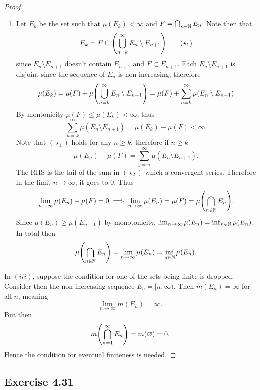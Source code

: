 \documentclass[hw_all.tex]{subfiles}
\begin{document}
\begin{proof}
\begin{enumerate}
        \item 
            Let $E_k$ be the set such that $\mu(E_k) < \infty$ and $F = \bigcap_{n \in \mathbb{N}} E_n$. Note then that
            \[
                E_k = F \;\dot{\cup}\; \qty(\bigcup_{n=k}^\infty E_{n} \setminus E_{n+1}) \tag{$\star_1$}
            \]
            since $E_{n} \setminus E_{n+1}$ doesn't contain $E_{n+1}$ and $F \subset E_{n+1}$. Each $E_{n} \setminus E_{n+1}$ is disjoint since the sequence of $E_n$ is non-increasing, therefore
            \[
                \mu(E_k) = \mu(F) + \mu\qty(\bigcup_{n=k}^\infty E_{n} \setminus E_{n+1}) = \mu(F) + \sum_{n=k}^\infty \mu(E_{n} \setminus E_{n+1})
            \]
            By montonicity $\mu(F) \leq \mu(E_k) < \infty$, thus
            \[
                \sum_{n=k}^\infty \mu(E_n \setminus E_{n+1}) = \mu(E_k) - \mu(F) < \infty \tag{$\star_2$}
            .\]
            Note that $(\star_1)$ holds for any $n \geq k$, therefore if $n \geq k$
            \[
                \mu(E_n) - \mu(F) = \sum_{j=n}^\infty \mu(E_n \setminus E_{n+1})
            .\]
            The RHS is the tail of the sum in $(\star_2)$ which a convergent series. Therefore in the limit $n \to \infty$, it goes to $0$. Thus
            \[
                \lim_{n \to \infty} \mu(E_n) - \mu(F) = 0 \implies \lim_{n \to \infty} \mu(E_n) = \mu(F) = \mu\qty(\bigcap_{n \in \mathbb{N}} E_n)
            .\]
            Since $\mu(E_n) \geq \mu(E_{n+1})$ by monotonicity, $\lim_{n \to \infty} \mu(E_n) = \inf_{n \in \mathbb{N}} \mu(E_n)$. In total then
            \[
                \mu\qty(\bigcap_{n \in \mathbb{N}} E_n) = \lim_{n \to \infty} \mu(E_n) = \inf_{n \in \mathbb{N}} \mu(E_n)
            .\]
    \end{enumerate}

    In $(iii)$, suppose the condition for one of the sets being finite is dropped. Consider then the non-increasing sequence $E_n = [n, \infty)$. Then $m(E_n) = \infty$ for all $n$, meaning
    \[
        \lim_{n \to \infty} m(E_n) = \infty
    .\]
    But then
    \[
        m\qty(\bigcap_{n = 1}^\infty E_n) = m(\varnothing) = 0
    .\]
    Hence the condition for eventual finiteness is needed.
\end{proof}

\subsection{Exercise 4.31}
\end{document}
